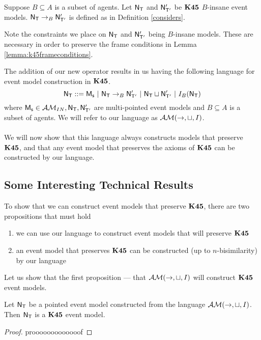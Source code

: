 \begin{defn} \label{defn:k45:considers}
	Suppose $B \subseteq A$ is a subset of agents.
	Let $\mathrm{\mathsf{N}}_\mathrm{\mathsf{T}}$ and $\mathrm{\mathsf{N}}'_{\mathrm{\mathsf{T}}'}$ be $\bf K45$ $B$-insane event models.
	$\mathrm{\mathsf{N}}_\mathrm{\mathsf{T}} \to_B \mathrm{\mathsf{N}}'_{\mathrm{\mathsf{T}}'}$ is defined as in Definition \ref{considers}.
\end{defn}

Note the constraints we place on $\mathrm{\mathsf{N}}_\mathrm{\mathsf{T}}$ and $\mathrm{\mathsf{N}}'_{\mathrm{\mathsf{T}}'}$ being $B$-insane models.
These are necessary in order to preserve the frame conditions in Lemma
\ref{lemma:k45frameconditions}.

\newcommand{\EM}{\ensuremath{\eventClass}}

The addition of our new operator results in us having the following language for
event model construction in $\bf K45$.
\[
	\mathrm{\mathsf{N}}_\mathrm{\mathsf{T}} ::= \mathrm{\mathsf{M_s}} \text{ } | \text{ }\mathrm{\mathsf{N}}_\mathrm{\mathsf{T}} \to_B \mathrm{\mathsf{N}}'_{\mathrm{\mathsf{T}}'} \text{ }|
  \text{ } \mathrm{\mathsf{N}}_\mathrm{\mathsf{T}} \sqcup \mathrm{\mathsf{N}}'_{\mathrm{\mathsf{T}}'} \text{ } | \text{ } I_B(\mathrm{\mathsf{N}}_\mathrm{\mathsf{T}})
\]
where $\mathrm{\mathsf{M_s}} \in \mathcal{AM}_{IN}, \mathrm{\mathsf{N}}_\mathrm{\mathsf{T}}, \mathrm{\mathsf{N}}'_{\mathrm{\mathsf{T}}'}$ are multi-pointed event models and $B \subseteq
A$ is a subset of agents.
We will refer to our language as $\EM(\to,\sqcup,I)$. \\
\\
We will now show that this language always constructs models that preserve $\bf K45$, and that any
event model that preserves the axioms of $\bf K45$ can be constructed by our language.

\subsection{Some Interesting Technical Results}

To show that we can construct event models that preserve $\bf K45$, there are two propositions that
must hold
\begin{enumerate}
	\item we can use our language to construct event models that will preserve $\bf K45$
	\item an event model that preserves $\bf K45$ can be constructed (up to $n$-bisimilarity) by our
		language
\end{enumerate}

Let us show that the first proposition --- that $\EM(\to,\sqcup,I)$ will construct $\bf K45$ event
models.

\begin{lemma}
	Let $\mathrm{\mathsf{N}}_\mathrm{\mathsf{T}}$ be a pointed event model constructed from the language $\EM(\to,\sqcup,I)$.
	Then $\mathrm{\mathsf{N}}_\mathrm{\mathsf{T}}$ is a $\bf K45$ event model.
\end{lemma}
\begin{proof}
	\FIXME prooooooooooooof
\end{proof}

